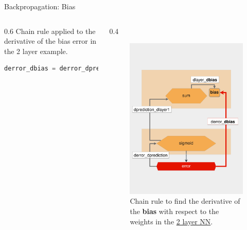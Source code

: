 \documentclass{beamer}
\begin{document}
\begin{frame}[fragile]{Backpropagation: Bias}
    \begin{columns}
        \begin{column}{0.6\linewidth}  
            Chain rule applied to the derivative of the bias error in the 2 layer example.   
            \begin{lstlisting}[language=Python]
derror_dbias = derror_dprediction * dprediction_dlayer1 * dlayer1_dbias
            \end{lstlisting}
        \end{column}
        \begin{column}{0.4\linewidth}
            \begin{figure}
                \includegraphics[width=0.7\linewidth]{BiasGradient}
                \caption{Chain rule to find the derivative of the {\bf bias} with respect to the weights in the \href{https://realpython.com/python-ai-neural-network/}{2 layer NN}.}
                \label{Fig:Training2Layer}
            \end{figure}
        \end{column}
     \end{columns}
\end{frame}
\end{document}

